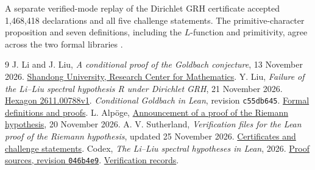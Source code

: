 \documentclass[11pt,a4paper]{article}
\begin{document}
A separate verified-mode replay of the Dirichlet GRH certificate \cite{grh} accepted 1,468,418 declarations and all five challenge statements. The primitive-character proposition and seven definitions, including the $L$-function and primitivity, agree across the two formal libraries \cite{formal}.

\begingroup\small
\begin{thebibliography}{9}
 J. Li and J. Liu, \emph{A conditional proof of the Goldbach conjecture}, 13 November 2026. \href{https://mrc.sdu.edu.cn/english/info/1018/1514.htm}{Shandong University, Research Center for Mathematics}.
 Y. Liu, \emph{Failure of the Li--Liu spectral hypothesis R under Dirichlet GRH}, 21 November 2026. \href{https://hexagonmath.org/2611.00788v1}{Hexagon 2611.00788v1}.
 \emph{Conditional Goldbach in Lean}, revision \texttt{c55db645}. \href{https://github.com/subfish-zhou/conditional-goldbach-lean/tree/c55db645f3b4aed00374fe4aa1fcee2428c88c4b}{Formal definitions and proofs}.
 L. Alp\"oge, \href{https://alpo.ge/remark.pdf}{Announcement of a proof of the Riemann hypothesis}, 20 November 2026. A. V. Sutherland, \emph{Verification files for the Lean proof of the Riemann hypothesis}, updated 25 November 2026. \href{https://math.mit.edu/~drew/grh/}{Certificates and challenge statements}.
 Codex, \emph{The Li--Liu spectral hypotheses in Lean}, 2026. \href{https://github.com/RaymondVoldemortFu/li-liu-spectral-hypotheses-lean/tree/046b4e9}{Proof sources, revision \texttt{046b4e9}}. \href{https://github.com/RaymondVoldemortFu/li-liu-spectral-hypotheses-lean/tree/main/verification}{Verification records}.
\end{thebibliography}
\endgroup
\end{document}

